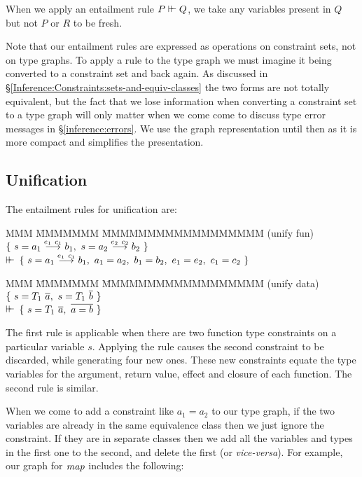 

When we apply an entailment rule $P \vdash\mkern-6mu\vdash Q$, we take any variables present in $Q$ but not $P$ or $R$ to be fresh.

Note that our entailment rules are expressed as operations on constraint sets, not on type graphs. To apply a rule to the type graph we must imagine it being converted to a constraint set and back again. As discussed in \S\ref{Inference:Constraints:sets-and-equiv-classes} the two forms are not totally equivalent, but the fact that we lose information when converting a constraint set to a type graph will only matter when we come come to discuss type error messages in \S\ref{inference:errors}. We use the graph representation until then as it is more compact and simplifies the presentation.

\clearpage{}
\subsection{Unification}


The entailment rules for unification are:

\begin{tabbing}
MMM \= MMMMMMM \= MMMMMMMMMMMMMMMMMM \kill
	\> (unify fun)	 \> $\{ \ s = a_1 \stackrel{e_1 \ c_1}{\longrightarrow} b_1, \ s = a_2 \stackrel{e_2 \ c_2}{\longrightarrow} b_2 \ \}$ \\
	\> \qq $\vdash\mkern-6mu\vdash$ \> $\{ \ s = a_1 \stackrel{e_1 \ c_1}{\longrightarrow} b_1, \ a_1 = a_2, \ b_1 = b_2, \ e_1 = e_2, \ c_1 = c_2 \ \}$	
\end{tabbing}

\begin{tabbing}
MMM \= MMMMMMM \= MMMMMMMMMMMMMMMMMM \kill
	\> (unify data)	 \> $\{ \ s = T_1 \ \ov{a}, \ s = T_1 \ \ov{b} \ \}$	\\[1ex]
	\> \qq $\vdash\mkern-6mu\vdash$ \> $\{ \ s = T_1 \ \overline{a}, \ \overline{a = b} \ \}$
\end{tabbing}

The first rule is applicable when there are two function type constraints on a particular variable $s$. Applying the rule causes the second constraint to be discarded, while generating four new ones. These new constraints equate the type variables for the argument, return value, effect and closure of each function. The second rule is similar.

When we come to add a constraint like $a_1 = a_2$ to our type graph, if the two variables are already in the same equivalence class then we just ignore the constraint. If they are in separate classes then we add all the variables and types in the first one to the second, and delete the first (or \emph{vice-versa}). For example, our graph for $\operatorname{\mathit{map}}$ includes the following:

